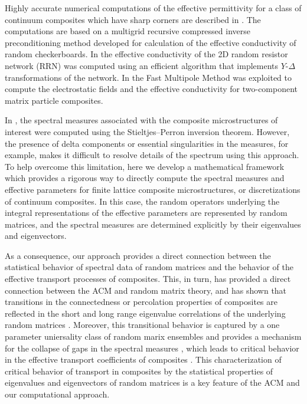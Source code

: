 \documentclass{cmslatex}
\begin{document}
Highly accurate numerical computations of the effective permittivity
for a class of continuum composites which have sharp corners are
described in \cite{Helsing:NJP:115005}. The computations are based on
a multigrid recursive compressed inverse preconditioning method
\cite{Helsing:2008:8820,Helsing:JCP:1171,Helsing:JCP:7533} developed 
for calculation of the effective conductivity of random
checkerboards. In \cite{Day:JPCM-96} the effective 
conductivity of the 2D random resistor network (RRN) 
was computed using an efficient algorithm that implements $Y$-$\Delta$
transformations of the network. In
\cite{Greengard:1994:379,Cheng:1997:629,Greengard:2006:64} the Fast
Multipole Method was exploited to compute the electrostatic fields and
the effective conductivity for two-component matrix particle
composites.      


In \cite{Helsing:NJP:115005,Day:JPCM-96}, the spectral measures
associated with the composite microstructures of interest were
computed using the Stieltjes--Perron inversion theorem. However, the
presence of delta components or essential singularities in the
measures, for example, makes it difficult to resolve details of the
spectrum using this approach. To help overcome this limitation, here
we develop a mathematical framework which provides a rigorous way to
directly compute the spectral measures and effective parameters for
finite lattice composite microstructures, or discretizations of
continuum composites. In this case, the random operators underlying the
integral representations of the effective parameters are represented
by random matrices, and the spectral measures are determined
explicitly by their eigenvalues and eigenvectors.



As a consequence,
our approach provides a direct connection between the statistical
behavior of spectral data of random matrices and the behavior of the
effective transport processes of composites. This, in turn, has
provided a direct connection between the ACM and random matrix theory,
and has shown that transitions in the connectedness or percolation
properties of composites are reflected in the short and long range
eigenvalue correlations of the underlying random matrices
\cite{Murphy_RMT_of_Composites}. Moreover, this transitional behavior
is captured by a one parameter uniersality class of random marix
ensembles and provides a mechanism for the collapse of gaps in the
spectral measures \cite{Murphy_RMT_of_Composites}, which leads to
critical behavior in the effective transport coefficients of
composites \cite{Murphy:JMP:063506}. This characterization of critical
behavior of transport in composites by the statistical properties of
eigenvalues and eigenvectors of random matrices is a key feature of
the ACM and our computational approach. 
\end{document}

